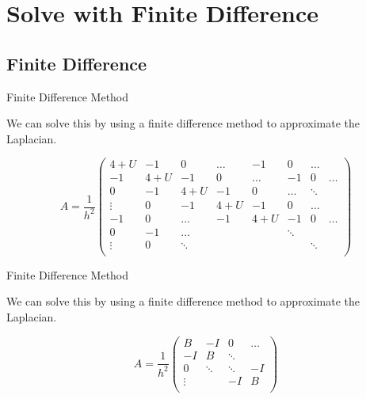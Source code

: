 \documentclass[mathserif]{beamer}
\begin{document}
\section{Solve with Finite Difference}

\subsection{Finite Difference}

\begin{frame}{Finite Difference Method}

 We can solve this by using a finite difference method to approximate the Laplacian.

 \[
  A =
  \frac{1}{h^2}
  \begin{pmatrix}
   4 + U  & -1    & 0      & \hdots & -1     & 0      & \hdots          \\
   -1     & 4 + U & -1     & 0      & \hdots & -1     & 0      & \hdots \\
   0      & -1    & 4 + U  & -1     & 0      & \hdots & \ddots          \\
   \vdots & 0     & -1     & 4 + U  & -1     & 0      & \hdots          \\
   -1     & 0     & \hdots & -1     & 4 + U  & -1     & 0      & \hdots \\
   0      & -1    & \hdots &        &        & \ddots &        &        \\
   \vdots & 0     & \ddots &        &        &        & \ddots &        \\
  \end{pmatrix}
 \]

\end{frame}

\begin{frame}{Finite Difference Method}

 We can solve this by using a finite difference method to approximate the Laplacian.

 \[
  A =
  \frac{1}{h^2}
  \begin{pmatrix}
   B      & -I     & 0      & \hdots \\
   -I     & B      & \ddots          \\
   0      & \ddots & \ddots & -I     \\
   \vdots &        & -I     & B      \\
  \end{pmatrix}
 \]

\end{frame}
\end{document}

